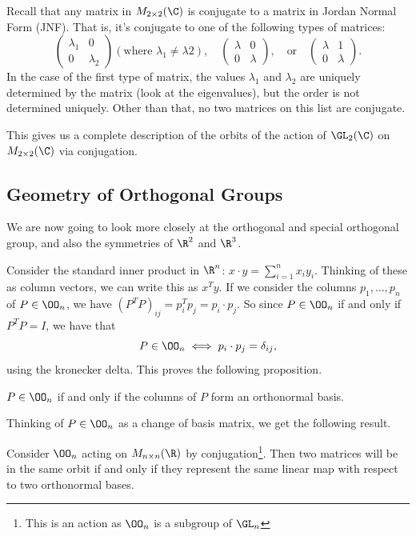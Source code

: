 \documentclass[a4paper]{scrartcl}
\newcommand{\newsection}{\subsection}
\begin{document}
\begin{example}
Recall that any matrix in $M_{2 \times 2}(\C)$ is conjugate to a matrix in Jordan Normal Form (JNF). That is, it's conjugate to one of the following types of matrices:
$$
\begin{pmatrix}
	\lambda_1 & 0 \\ 0 & \lambda_2
\end{pmatrix} (\text{where }\lambda_1 \neq \lambda 2), \quad \begin{pmatrix}
	\lambda & 0 \\ 0 & \lambda
\end{pmatrix}, \quad \text{or} \quad \begin{pmatrix}
	\lambda & 1 \\ 0 & \lambda
\end{pmatrix}.
$$
In the case of the first type of matrix, the values $\lambda_1$ and $\lambda_2$ are uniquely determined by the matrix (look at the eigenvalues), but the order is not determined uniquely. Other than that, no two matrices on this list are conjugate.

This gives us a complete description of the orbits of the action of $\GL_2(\C)$ on $M_{2 \times 2}(\C)$ via conjugation.
\end{example}

\newsection{Geometry of Orthogonal Groups}

We are now going to look more closely at the orthogonal and special orthogonal group, and also the symmetries of $\R^2$ and $\R^3$.

Consider the standard inner product in $\R^n$: $x \cdot y = \sum_{i = 1}^n x_i y_i$. Thinking of these as column vectors, we can write this as $x^T y$. If we consider the columns $p_1, \dots, p_n$ of $P \in \OO_n$, we have $(P^T P)_{ij} = p_i^T p_j = p_i \cdot p_j$. So since $P \in \OO_n$ if and only if $P^T P = I$, we have that
$$
P \in \OO_n \iff p_i \cdot p_j = \delta_{ij},
$$
using the kronecker delta. 
This proves the following proposition.

\begin{proposition}
	$P \in \OO_n$ if and only if the columns of $P$ form an orthonormal basis.
\end{proposition}

Thinking of $P \in \OO_n$ as a change of basis matrix, we get the following result.

\begin{proposition}
	Consider $\OO_n$ acting on $M_{n \times n}(\R)$ by conjugation\footnote{This is an action as $\OO_n$ is a subgroup of $\GL_n$}. Then two matrices will be in the same orbit if and only if they represent the same linear map with respect to two orthonormal bases.
\end{proposition}
\end{document}
